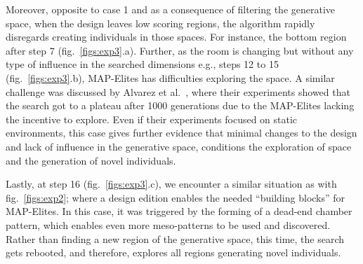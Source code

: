 Moreover, opposite to case 1 and as a consequence of filtering the generative space, when the design leaves low scoring regions, the algorithm rapidly disregards creating individuals in those spaces. For instance, the bottom region after step 7 (fig.~\ref{figs:exp3}.a). Further, as the room is changing but without any type of influence in the searched dimensions e.g., steps 12 to 15 (fig.~\ref{figs:exp3}.b), MAP-Elites has difficulties exploring the space. A similar challenge was discussed by Alvarez et al.~, where their experiments showed that the search got to a plateau after 1000 generations due to the MAP-Elites lacking the incentive to explore. Even if their experiments focused on static environments, this case gives further evidence that minimal changes to the design and lack of influence in the generative space, conditions the exploration of space and the generation of novel individuals. 

Lastly, at step 16 (fig.~\ref{figs:exp3}.c), we encounter a similar situation as with fig.~\ref{figs:exp2};  where a design edition enables the needed “building blocks” for MAP-Elites. In this case, it was triggered by the forming of a dead-end chamber pattern, which enables even more meso-patterns to be used and discovered. Rather than finding a new region of the generative space, this time, the search gets rebooted, and therefore, explores all regions generating novel individuals.





